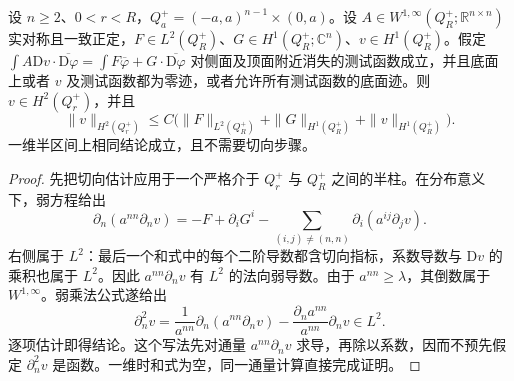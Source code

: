 \begin{lemma}\label{g3:lem:flat-boundary-h2-div-source}
	设 \(n\ge2\)、\(0<r<R\)，\(Q_a^+=(-a,a)^{n-1}\times(0,a)\)。设 \(A\in W^{1,\infty}(Q_R^+;\mathbb R^{n\times n})\) 实对称且一致正定，\(F\in L^2(Q_R^+)\)、\(G\in H^1(Q_R^+;\mathbb C^n)\)、\(v\in H^1(Q_R^+)\)。假定 \(\int A\mathrm Dv\cdot\overline{\mathrm D\varphi}=\int F\overline\varphi+G\cdot\overline{\mathrm D\varphi}\) 对侧面及顶面附近消失的测试函数成立，并且底面上或者 \(v\) 及测试函数都为零迹，或者允许所有测试函数的底面迹。则
	\(v\in H^2(Q_r^+)\)，并且
	\[
	\|v\|_{H^2(Q_r^+)}
	\le C\bigl(\|F\|_{L^2(Q_R^+)}
							+\|G\|_{H^1(Q_R^+)}+\|v\|_{H^1(Q_R^+)}\bigr).
	\]
	一维半区间上相同结论成立，且不需要切向步骤。
\end{lemma}
\begin{proof}
	先把切向估计应用于一个严格介于 \(Q_r^+\) 与 \(Q_R^+\) 之间的半柱。在分布意义下，弱方程给出
	\[
	\partial_n(a^{nn}\partial_nv)
	=-F+\partial_iG^i
							-\sum_{(i,j)\ne(n,n)}\partial_i(a^{ij}\partial_jv).
	\]
	右侧属于 \(L^2\)：最后一个和式中的每个二阶导数都含切向指标，系数导数与 \(\mathrm Dv\) 的乘积也属于 \(L^2\)。因此 \(a^{nn}\partial_nv\) 有 \(L^2\) 的法向弱导数。由于
	\(a^{nn}\ge\lambda\)，其倒数属于 \(W^{1,\infty}\)。弱乘法公式遂给出
	\[
	\partial_n^2v
	=\frac1{a^{nn}}\partial_n(a^{nn}\partial_nv)
			-\frac{\partial_na^{nn}}{a^{nn}}\partial_nv\in L^2.
	\]
	逐项估计即得结论。这个写法先对通量 \(a^{nn}\partial_nv\) 求导，再除以系数，因而不预先假定 \(\partial_n^2v\) 是函数。一维时和式为空，同一通量计算直接完成证明。
\end{proof}

